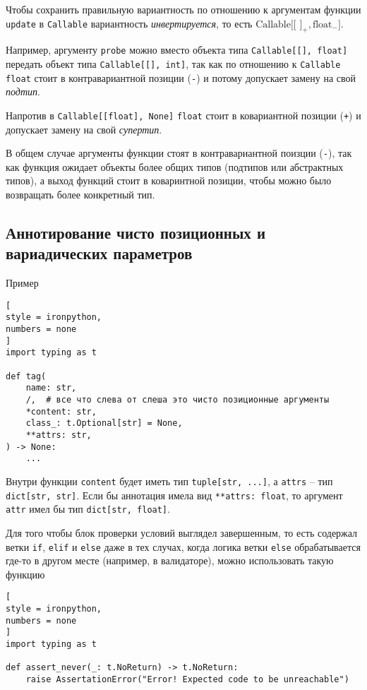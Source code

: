 \documentclass[%
	11pt,
	a4paper,
	utf8,
		]{article}
\begin{document}
Чтобы сохранить правильную вариантность по отношению к аргументам функции \verb*|update| в \verb*|Callable| вариантность \emph{инвертируется}, то есть $\text{Callable[[\ ]}_+, \text{float}_{-}]$.

Например, аргументу \verb*|probe| можно вместо объекта типа \verb|Callable[[], float]| передать объект типа \verb|Callable[[], int]|, так как по отношению к \verb*|Callable| \verb*|float| стоит в контравариантной позиции (\texttt{-}) и потому допускает замену на свой \emph{подтип}.

Напротив в \verb|Callable[[float], None]| \verb*|float| стоит в ковариантной позиции (\texttt{+}) и допускает замену на свой \emph{супертип}.

В общем случае аргументы функции стоят в контравариантной поизции (\texttt{-}), так как функция ожидает объекты более общих типов (подтипов или абстрактных типов), а выход функций стоит в коваринтной позиции, чтобы можно было возвращать более конкретный тип.

\subsection{Аннотирование чисто позиционных и вариадических параметров}

Пример
\begin{lstlisting}[
style = ironpython,
numbers = none
]
import typing as t

def tag(
    name: str,
    /,  # все что слева от слеша это чисто позиционные аргументы
    *content: str,
    class_: t.Optional[str] = None,
    **attrs: str,
) -> None:
    ...
\end{lstlisting}

Внутри функции \verb*|content| будет иметь тип \verb|tuple[str, ...]|, а \verb*|attrs| -- тип \verb|dict[str, str]|. Если бы аннотация имела вид \verb|**attrs: float|, то аргумент \verb*|attr| имел бы тип \verb|dict[str, float]|.

Для того чтобы блок проверки условий выглядел завершенным, то есть содержал ветки \verb*|if|, \verb*|elif| и \verb*|else| даже в тех случах, когда логика ветки \verb*|else| обрабатывается где-то в другом месте (например, в валидаторе), можно использовать такую функцию
\begin{lstlisting}[
style = ironpython,
numbers = none
]
import typing as t

def assert_never(_: t.NoReturn) -> t.NoReturn:
    raise AssertationError("Error! Expected code to be unreachable")
\end{lstlisting}
\end{document}
